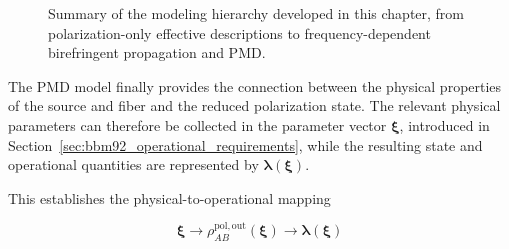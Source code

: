 \begin{figure}[H]
    \centering


    \caption{
        Summary of the modeling hierarchy developed in this chapter, from
        polarization-only effective descriptions to frequency-dependent
        birefringent propagation and PMD.
    }
    \label{fig:complete_modeling_hierarchy}
\end{figure}

The PMD model finally provides the connection between the physical properties of
the source and fiber and the reduced polarization state. The relevant physical
parameters can therefore be collected in the parameter vector
\(\boldsymbol{\xi}\), introduced in
Section~\ref{sec:bbm92_operational_requirements}, while the resulting state and
operational quantities are represented by
\(\boldsymbol{\lambda}(\boldsymbol{\xi})\).

This establishes the physical-to-operational mapping

\begin{equation}
\boxed{
\boldsymbol{\xi}
\longrightarrow
\rho_{AB}^{\mathrm{pol,out}}(\boldsymbol{\xi})
\longrightarrow
\boldsymbol{\lambda}(\boldsymbol{\xi})
}
\label{eq:pmd_physical_operational_mapping}
\end{equation}

